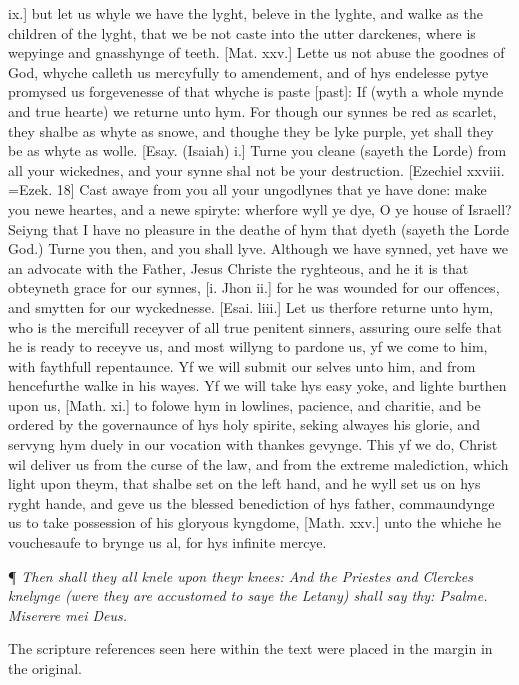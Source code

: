 ix.] but let us whyle we have the lyght, beleve in the lyghte,
and walke as the children of the lyght, that we be not caste into the
utter darckenes, where is wepyinge and gnasshynge of teeth. [Mat.
xxv.] Lette us not abuse the goodnes of God, whyche calleth us
mercyfully to amendement, and of hys endelesse pytye promysed us forgevenesse
of that whyche is paste [past]:
If (wyth a whole mynde and true hearte) we returne unto hym. For though
our synnes be red as scarlet, they shalbe as whyte as snowe, and thoughe
they be lyke purple, yet shall they be as whyte as wolle. [Esay.
(Isaiah)
i.] Turne you cleane (sayeth the Lorde) from all your wickednes,
and your synne shal not be your destruction. [Ezechiel
xxviii. =Ezek.
18] Cast awaye from you all your ungodlynes that ye have
done: make you newe heartes, and a newe spiryte: wherfore wyll ye dye,
O ye house of Israell? Seiyng that I have no pleasure in the deathe of
hym that dyeth (sayeth the Lorde God.) Turne you then, and you shall lyve.
Although we have synned, yet have we an advocate with the Father, Jesus
Christe the ryghteous, and he it is that obteyneth grace for our synnes,
[i. Jhon ii.] for he was wounded for our offences,
and smytten for our wyckednesse. [Esai. liii.]
Let us therfore returne unto hym, who is the mercifull receyver of all
true penitent sinners, assuring oure selfe that he is ready to receyve
us, and most willyng to pardone us, yf we come to him, with faythfull
repentaunce. Yf we will submit our selves unto him, and from hencefurthe
walke in his wayes. Yf we will take hys easy yoke, and lighte burthen
upon us, [Math. xi.] to folowe hym in lowlines,
pacience, and charitie, and be ordered by the governaunce of hys holy
spirite, seking alwayes his glorie, and servyng hym duely in our vocation
with thankes gevynge. This yf we do, Christ wil deliver us from the curse
of the law, and from the extreme malediction, which light upon theym,
that shalbe set on the left hand, and he wyll set us on hys ryght
hande, and geve us the blessed benediction of hys father, commaundynge
us to take possession of his gloryous kyngdome, [Math.
xxv.] unto the whiche he vouchesaufe to brynge us al, for hys infinite
mercye.

¶ \emph{Then
shall they all knele upon theyr knees: And the Priestes and Clerckes knelynge
(were they are accustomed to saye the Letany) shall say thy: Psalme. Miserere
mei Deus.}

The
scripture references seen here within the text were placed in the margin
in the original.

